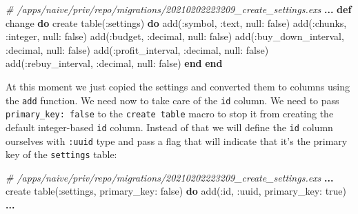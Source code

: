 \documentclass[
]{book}
\newenvironment{Shaded}{\begin{snugshade}}{\end{snugshade}}
\newcommand{\CommentTok}[1]{\textcolor[rgb]{0.56,0.35,0.01}{\textit{#1}}}
\newcommand{\ConstantTok}[1]{\textcolor[rgb]{0.00,0.00,0.00}{#1}}
\newcommand{\KeywordTok}[1]{\textcolor[rgb]{0.13,0.29,0.53}{\textbf{#1}}}
\newcommand{\NormalTok}[1]{#1}
\newcommand{\OperatorTok}[1]{\textcolor[rgb]{0.81,0.36,0.00}{\textbf{#1}}}
\newcommand{\VariableTok}[1]{\textcolor[rgb]{0.00,0.00,0.00}{#1}}
\begin{document}
\begin{Shaded}
\begin{Highlighting}[]
\CommentTok{\# /apps/naive/priv/repo/migrations/20210202223209\_create\_settings.exs}
\OperatorTok{...}
  \KeywordTok{def}\NormalTok{ change }\KeywordTok{do}
\NormalTok{    create table(}\VariableTok{:settings}\NormalTok{) }\KeywordTok{do}
\NormalTok{      add(}\VariableTok{:symbol}\NormalTok{, }\VariableTok{:text}\NormalTok{, }\VariableTok{null:} \ConstantTok{false}\NormalTok{)}
\NormalTok{      add(}\VariableTok{:chunks}\NormalTok{, }\VariableTok{:integer}\NormalTok{, }\VariableTok{null:} \ConstantTok{false}\NormalTok{)}
\NormalTok{      add(}\VariableTok{:budget}\NormalTok{, }\VariableTok{:decimal}\NormalTok{, }\VariableTok{null:} \ConstantTok{false}\NormalTok{)}
\NormalTok{      add(}\VariableTok{:buy\_down\_interval}\NormalTok{, }\VariableTok{:decimal}\NormalTok{, }\VariableTok{null:} \ConstantTok{false}\NormalTok{)}
\NormalTok{      add(}\VariableTok{:profit\_interval}\NormalTok{, }\VariableTok{:decimal}\NormalTok{, }\VariableTok{null:} \ConstantTok{false}\NormalTok{)}
\NormalTok{      add(}\VariableTok{:rebuy\_interval}\NormalTok{, }\VariableTok{:decimal}\NormalTok{, }\VariableTok{null:} \ConstantTok{false}\NormalTok{)}
    \KeywordTok{end}
  \KeywordTok{end}
\end{Highlighting}
\end{Shaded}

At this moment we just copied the settings and converted them to columns using the \texttt{add} function. We need now to take care of the \texttt{id} column. We need to pass \texttt{primary\_key:\ false} to the \texttt{create\ table} macro to stop it from creating the default integer-based \texttt{id} column. Instead of that we will define the \texttt{id} column ourselves with \texttt{:uuid} type and pass a flag that will indicate that it's the primary key of the \texttt{settings} table:

\begin{Shaded}
\begin{Highlighting}[]
\CommentTok{\# /apps/naive/priv/repo/migrations/20210202223209\_create\_settings.exs}
\OperatorTok{...}
\NormalTok{    create table(}\VariableTok{:settings}\NormalTok{, }\VariableTok{primary\_key:} \ConstantTok{false}\NormalTok{) }\KeywordTok{do}
\NormalTok{      add(}\VariableTok{:id}\NormalTok{, }\VariableTok{:uuid}\NormalTok{, }\VariableTok{primary\_key:} \ConstantTok{true}\NormalTok{)}
      \OperatorTok{...}
\end{Highlighting}
\end{Shaded}
\end{document}
